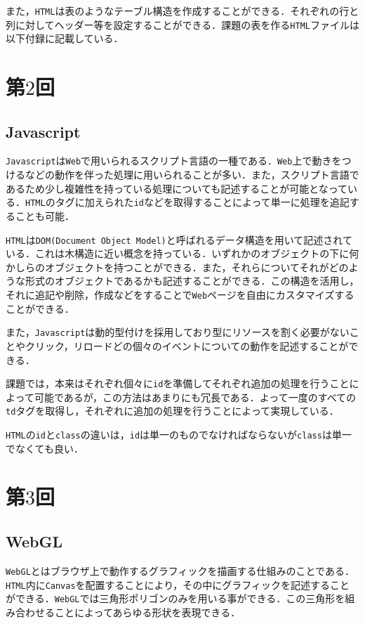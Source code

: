 \documentclass[paper=a4, fontsize=10pt]{jlreq}
\begin{document}
\vspace{0.5cm}

また，\verb|HTML|は表のようなテーブル構造を作成することができる．それぞれの行と列に対してヘッダー等を設定することができる．課題の表を作る\verb|HTML|ファイルは以下付録に記載している．

\section*{第$2$回}
\subsection*{Javascript}
\verb|Javascript|は\verb|Web|で用いられるスクリプト言語の一種である．\verb|Web|上で動きをつけるなどの動作を伴った処理に用いられることが多い．また，スクリプト言語であるため少し複雑性を持っている処理についても記述することが可能となっている．\verb|HTML|のタグに加えられた\verb|id|などを取得することによって単一に処理を追記することも可能．

\verb|HTML|は\verb|DOM(Document Object Model)|と呼ばれるデータ構造を用いて記述されている．これは木構造に近い概念を持っている．いずれかのオブジェクトの下に何かしらのオブジェクトを持つことができる．また，それらについてそれがどのような形式のオブジェクトであるかも記述することができる．この構造を活用し，それに追記や削除，作成などをすることで\verb|Web|ページを自由にカスタマイズすることができる\cite{Flanagan2020}．

また，\verb|Javascript|は動的型付けを採用しており型にリソースを割く必要がないことやクリック，リロードどの個々のイベントについての動作を記述することができる．

課題では，本来はそれぞれ個々に\verb|id|を準備してそれぞれ追加の処理を行うことによって可能であるが，この方法はあまりにも冗長である．よって一度のすべての\verb|td|タグを取得し，それぞれに追加の処理を行うことによって実現している．

\vspace{0.5cm}

\verb|HTML|の\verb|id|と\verb|class|の違いは，\verb|id|は単一のものでなければならないが\verb|class|は単一でなくても良い．

\section*{第$3$回}
\subsection*{WebGL}
\verb|WebGL|とはブラウザ上で動作するグラフィックを描画する仕組みのことである．\verb|HTML|内に\verb|Canvas|を配置することにより，その中にグラフィックを記述することができる．\verb|WebGL|では三角形ポリゴンのみを用いる事ができる\cite{WebGL_Spec}．この三角形を組み合わせることによってあらゆる形状を表現できる．
\end{document}
